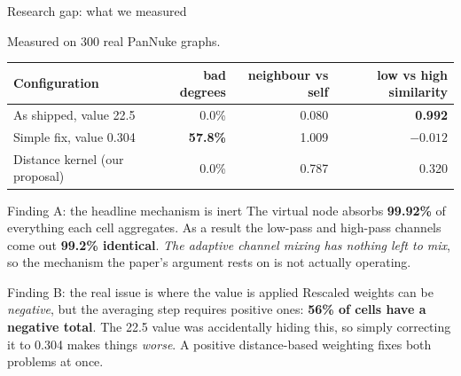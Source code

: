 \documentclass[aspectratio=169,11pt]{beamer}
\newcommand{\al}[1]{\textcolor{eosin}{\textbf{#1}}}
\begin{document}
\begin{frame}{Research gap: what we measured}

  Measured on 300 real PanNuke graphs.

  \vspace{0.3em}
  \begin{center}\footnotesize
  \begin{tabular}{@{}lrrr@{}}
    \toprule
    \textbf{Configuration} & \textbf{bad degrees} & \textbf{neighbour vs self} & \textbf{low vs high similarity} \\
    \midrule
    As shipped, value 22.5          & 0.0\%  & 0.080 & \al{0.992} \\
    Simple fix, value 0.304         & \al{57.8\%} & 1.009 & $-0.012$ \\
    Distance kernel (our proposal)  & \textcolor{goodgreen}{0.0\%} & 0.787 & \textcolor{goodgreen}{0.320} \\
    \bottomrule
  \end{tabular}
  \end{center}

  \vspace{0.3em}
  \begin{alertblock}{Finding A: the headline mechanism is inert}
    \footnotesize The virtual node absorbs \textbf{99.92\%} of everything each
    cell aggregates. As a result the low-pass and high-pass channels come out
    \textbf{99.2\% identical}. \emph{The adaptive channel mixing has nothing left
    to mix}, so the mechanism the paper's argument rests on is not actually
    operating.
  \end{alertblock}

  \begin{block}{Finding B: the real issue is where the value is applied}
    \footnotesize Rescaled weights can be \emph{negative}, but the averaging step
    requires positive ones: \textbf{56\% of cells have a negative total}. The
    22.5 value was accidentally hiding this, so simply correcting it to 0.304
    makes things \emph{worse}. A positive distance-based weighting fixes both
    problems at once.
  \end{block}

\end{frame}
\end{document}
